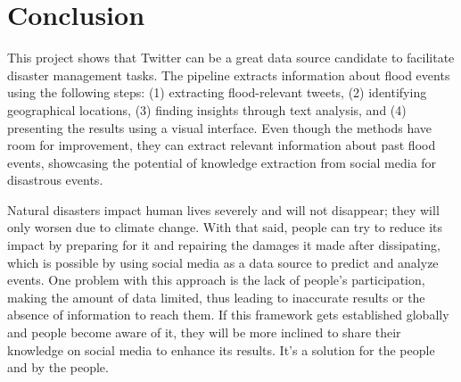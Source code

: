 \chapter{Conclusion}%
This project shows that Twitter can be a great data source candidate to facilitate disaster
management tasks. The pipeline extracts information about flood events using the following steps:
(1) extracting flood-relevant tweets, (2) identifying geographical locations, (3) finding insights
through text analysis, and (4) presenting the results using a visual interface. Even though the
methods have room for improvement, they can extract relevant information about past flood events,
showcasing the potential of knowledge extraction from social media for disastrous events.

Natural disasters impact human lives severely and will not disappear; they will only worsen due to
climate change. With that said, people can try to reduce its impact by preparing for it and
repairing the damages it made after dissipating, which is possible by using social media as a data
source to predict and analyze events. One problem with this approach is the lack of people's
participation, making the amount of data limited, thus leading to inaccurate results or the absence
of information to reach them. If this framework gets established globally and people become aware of
it, they will be more inclined to share their knowledge on social media to enhance its results. It's
a solution for the people and by the people.

